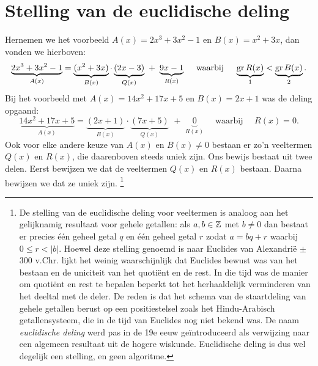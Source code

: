 \documentclass{ximera}
\begin{document}
\section{Stelling van de euclidische deling}

Hernemen we het voorbeeld $A(x) = 2x^3+3x^2-1$ en $B(x) = x^2+3x$, dan vonden we hierboven:
\[
\underbrace{2x^3+3x^2-1}_{A(x)} = \underbrace{(x^2+3x)}_{B(x)}\cdot\underbrace{(2x-3)}_{Q(x)} \,\, + \,\, \underbrace{9x-1}_{R(x)} \quad \text{ waarbij } \quad \underbrace{\operatorname{gr} R(x)}_{1} < \underbrace{\operatorname{gr} B(x)}_{2}.
\]
Bij het voorbeeld met $A(x) = 14x^2+17x+5$ en $B(x) = 2x+1$ was de deling opgaand:
\[
\underbrace{14x^2+17x+5}_{A(x)} = \underbrace{(2x+1)}_{B(x)}\cdot\underbrace{(7x+5)}_{Q(x)} \,\, + \,\, \underbrace{0}_{R(x)} \quad \text{ waarbij } \quad R(x) = 0.
\]
Ook voor elke andere keuze van $A(x)$ en $B(x) \neq 0$ bestaan er zo'n veeltermen $Q(x)$ en $R(x)$, die daarenboven steeds uniek zijn. Ons bewijs bestaat uit twee delen. Eerst bewijzen we dat de veeltermen $Q(x)$ en $R(x)$ bestaan. Daarna bewijzen we dat ze uniek zijn. \footnote{De stelling van de euclidische deling voor veeltermen is analoog aan het gelijknamig resultaat voor gehele getallen: als $a,b \in \mathbb{Z}$ met $b \neq 0$ dan bestaat er precies \'e\'en geheel getal $q$ en \'e\'en geheel getal $r$ zodat $a = bq + r$ waarbij $0 \leq r < \left|b\right|$. Hoewel deze stelling genoemd is naar Euclides van Alexandri\"e $\pm$300 v.Chr. lijkt het weinig waarschijnlijk dat Euclides bewust was van het bestaan en de uniciteit van het quoti\"ent en de rest. In die tijd was de manier om quoti\"ent en rest te bepalen beperkt tot het herhaaldelijk verminderen van het deeltal met de deler. De reden is dat het schema van de staartdeling van gehele getallen berust op een positiestelsel zoals het Hindu-Arabisch getallensysteem, die in de tijd van Euclides nog niet bekend was. De naam {\em euclidische deling} werd pas in de 19e eeuw ge\"introduceerd als verwijzing naar een algemeen resultaat uit de hogere wiskunde. Euclidische deling is dus wel degelijk een stelling, en geen algoritme.}
\end{document}
